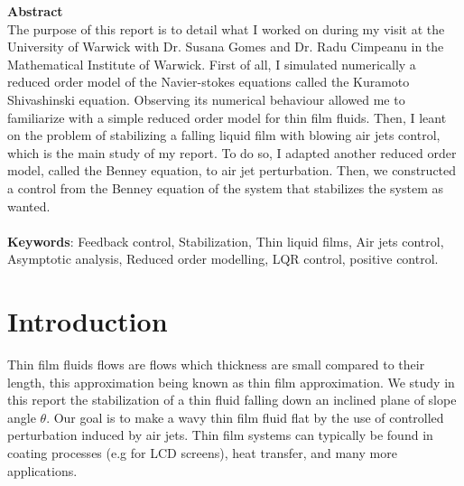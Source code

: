\documentclass[12pt]{article}
\begin{document}
{\large \textbf{Abstract}} \\
{\normalsize The purpose of this report is to detail what I worked on during my visit at the University of Warwick with Dr. Susana Gomes and Dr. Radu Cimpeanu in the Mathematical Institute of Warwick. First of all, I simulated numerically a reduced order model of the Navier-stokes equations called the Kuramoto Shivashinski equation. Observing its numerical behaviour allowed me to familiarize with a simple reduced order model for thin film fluids. Then, I leant on the problem of stabilizing a falling liquid film with blowing air jets control, which is the main study of my report. To do so, I adapted another reduced order model, called the Benney equation, to air jet perturbation. Then, we constructed a control from the Benney equation of the system that stabilizes the system as wanted.} \\
\vspace{0.8cm} \\
{\large \textbf{Keywords}: \normalsize Feedback control, Stabilization, Thin liquid films, Air jets control, Asymptotic analysis, Reduced order modelling, LQR control, positive control.}


\newpage
\tableofcontents
\newpage



\section{Introduction}
Thin film fluids flows are flows which thickness are small compared to their length, this approximation being known as thin film approximation. We study in this report the stabilization of a thin fluid falling down an inclined plane of slope angle $\theta$. Our goal is to make  a wavy thin film fluid flat by the use of controlled perturbation induced by air jets. Thin film systems can typically be found in coating processes (e.g for LCD screens), heat transfer, and many more applications.\\
\end{document}

